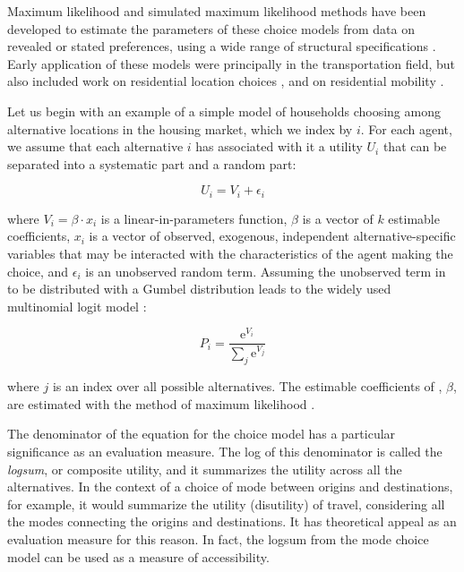 Maximum likelihood and simulated maximum likelihood methods have been developed to estimate the parameters of these choice models from data on revealed or stated preferences, using a wide range of structural specifications \citep{train-book-2003}. Early application of these models were principally in the transportation field, but also included work on residential location choices \citep{quigley-eer-1976,lerman-trr-1977,mcfadden-1978}, and on residential mobility \citep{clark-vanlierop-1986}.

Let us begin with an example of a simple model of households choosing among alternative locations in the housing market, which we index by $i$. For each agent, we assume that each alternative $i$ has associated with it a utility $U_i$ that can be separated into a systematic part and a random part:

\begin{equation}
    \label{eq:utility}
    U_i = V_i + \epsilon_i
\end{equation}

where $V_i = \beta\cdot {x}_i$ is a linear-in-parameters function, $\beta$ is a vector of $k$ estimable coefficients,
$x_i$ is a vector of observed, exogenous, independent alternative-specific variables that may be interacted with the
characteristics of the agent making the choice, and $\epsilon_i$ is an unobserved random term. Assuming the unobserved term in  to be distributed with a Gumbel distribution leads to the widely used multinomial logit model \citep{mcfadden-1974,mcfadden-1981}:

\begin{equation}
    \label{eq:mnl}
    P_i = \frac{\mathrm{e}^{V_i}}{\sum_j \mathrm{e}^{V_j}}
\end{equation}

where $j$ is an index over all possible alternatives. The estimable coefficients of , $\beta$, are estimated with the method of maximum likelihood \citep{greene-2002}.

The denominator of the equation for the choice model has a particular significance as an evaluation measure. The log of this denominator is called the \emph{logsum}, or composite utility, and it summarizes the utility across all the alternatives. In the context of a choice of mode between origins and destinations, for example, it would summarize the utility (disutility) of travel, considering all the modes connecting the origins and destinations. It has theoretical appeal as an evaluation measure for this reason. In fact, the logsum from the mode choice model can be used as a measure of accessibility.


